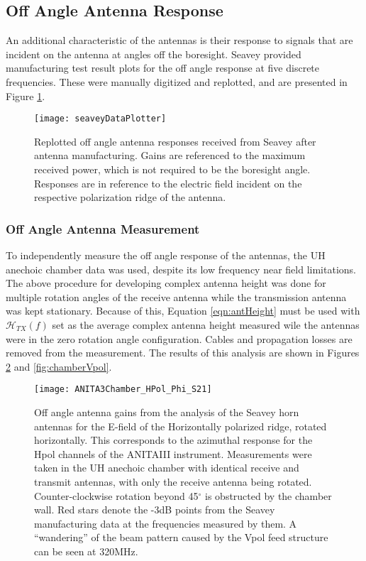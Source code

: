 	\subsection{Off Angle Antenna Response}
		An additional characteristic of the antennas is their response to signals that are incident on the antenna at angles off the boresight.  Seavey provided manufacturing test result plots for the off angle response at five discrete frequencies.  These were manually digitized and replotted, and are presented in Figure \ref{fig:seaveyOffAngle}.
		
		
\begin{figure}
\centering
	\texttt{[image: seaveyDataPlotter]}
	\caption{Replotted off angle antenna responses received from Seavey after antenna manufacturing.  Gains are referenced to the maximum received power, which is not required to be the boresight angle.  Responses are in reference to the electric field incident on the respective polarization ridge of the antenna.}
\label{fig:seaveyOffAngle}
\end{figure}

	\subsubsection{Off Angle Antenna Measurement} %
To independently measure the off angle response of the antennas, the UH anechoic chamber data was used, despite its low frequency near field limitations.  The above procedure for developing complex antenna height was done for multiple rotation angles of the receive antenna while the transmission antenna was kept stationary.  Because of this, Equation \ref{eqn:antHeight} must be used with $\mathcal{H}_{TX}(f)$ set as the average complex antenna height measured wile the antennas were in the zero rotation angle configuration.  Cables and propagation losses are removed from the measurement. The results of this analysis are shown in Figures \ref{fig:chamberHpol} and \ref{fig:chamberVpol}.
		
\begin{figure}
\centering
	\texttt{[image: ANITA3Chamber\_HPol\_Phi\_S21]}
	\caption{Off angle antenna gains from the analysis of the Seavey horn antennas for the E-field of the Horizontally polarized ridge, rotated horizontally.  This corresponds to the azimuthal response for the Hpol channels of the ANITAIII instrument.  Measurements were taken in the UH anechoic chamber with identical receive and transmit antennas, with only the receive antenna being rotated.  Counter-clockwise rotation beyond 45$^\circ$ is obstructed by the chamber wall.  Red stars denote the -3dB points from the Seavey manufacturing data at the frequencies measured by them. A ``wandering'' of the beam pattern caused by the Vpol feed structure can be seen at 320MHz.}
\label{fig:chamberHpol}
\end{figure}

